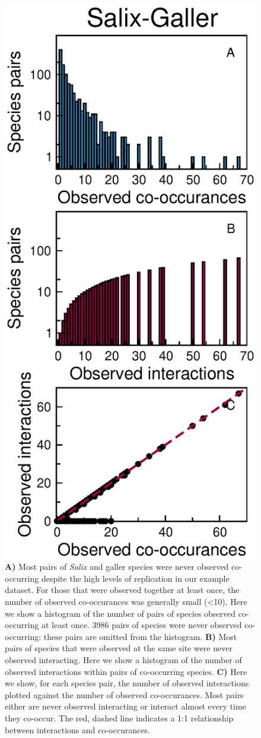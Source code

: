 \documentclass[12pt]{article}
\begin{document}
  \begin{figure}
    \caption{\textbf{A)} Most pairs of \emph{Salix} and galler species were never observed co-occurring despite the high levels of replication in our example dataset. For those that were observed together at least once, the number of observed co-occurances was generally small (\textless10). Here we show a histogram of the number of pairs of species observed co-occurring at least once. 3986 pairs of species were never observed co-occurring: these pairs are omitted from the histogram. \textbf{B)} Most pairs of species that were observed at the same site were never observed interacting. Here we show a histogram of the number of observed interactions within pairs of co-occurring species. \textbf{C)} Here we show, for each species pair, the number of observed interactions plotted against the number of observed co-occurances. Most pairs either are never observed interacting or interact almost every time they co-occur. The red, dashed line indicates a 1:1 relationship between interactions and co-occurances.}
    \label{histograms}
    \includegraphics*[width=.8\textwidth]{figures/Salix_Galler_histogram.eps}
    \end{figure}
\end{document}
